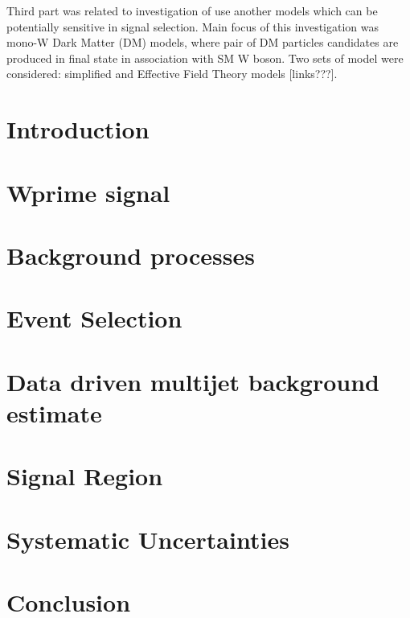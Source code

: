 Third part was related to investigation of use another models which can be potentially sensitive in signal selection.
Main focus of this investigation was mono-W Dark Matter (DM) models, where pair of DM particles candidates are produced in final state in association with SM W boson.
Two sets of model were considered: simplified and Effective Field Theory models [links???]. 


\section{Introduction}
\label{sec:wprimeIntro}

\section{Wprime signal}
\label{sec:wprimeSignal}

\section{Background processes}
\label{sec:wprimeBackgrounds}

\section{Event Selection}
\label{sec:wprimeEventSelection}

\section{Data driven multijet background estimate}
\label{sec:wprimeMultijetBackground}

\section{Signal Region}
\label{sec:wprimeSignalRegion}

\section{Systematic Uncertainties}
\label{sec:wprimeSystematics}

\section{Conclusion}
\label{sec:wprimeConclusion}



